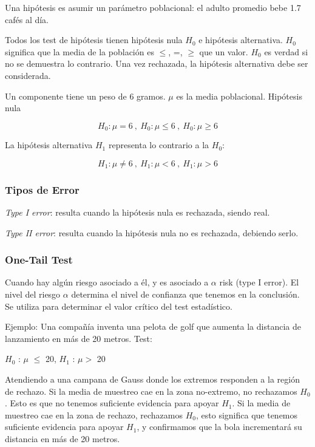 \documentclass[]{article}
\begin{document}
Una hipótesis es asumir un parámetro poblacional: el adulto promedio bebe 1.7 cafés al día.

Todos los test de hipótesis tienen hipótesis nula $H_0$ e hipótesis alternativa. $H_0$ significa que la media de la población es $\leq$, =, $\geq$ que un valor. $H_0$ es verdad si no se demuestra lo contrario. Una vez rechazada, la hipótesis alternativa debe ser considerada.

Un componente tiene un peso de 6 gramos. $\mu$ es la media poblacional. Hipótesis nula

\begin{equation}
H_0 : \mu = 6 \ , \ H_0 : \mu \leq 6 \ , \ H_0 : \mu \geq 6
\end{equation}

La hipótesis alternativa $H_1$ representa lo contrario a la $H_0$:

\begin{equation}
H_1 : \mu \neq 6 \ , \ H_1 : \mu < 6 \ , \ H_1 : \mu > 6
\end{equation}

\subsubsection{Tipos de Error}

\textit{Type I error}: resulta cuando la hipótesis nula es rechazada, siendo real. 

\textit{Type II error}: resulta cuando la hipótesis nula no es rechazada, debiendo serlo.

\subsubsection{One-Tail Test}

Cuando hay algún riesgo asociado a él, y es asociado a $\alpha$ risk (type I error). El nivel del riesgo $\alpha$ determina el nivel de confianza que tenemos en la conclusión. Se utiliza para determinar el valor crítico del test estadístico.

Ejemplo: Una compañía inventa una pelota de golf que aumenta la distancia de lanzamiento en más de 20 metros. Test:  \newline \begin{center}
	$H_0$ : $\mu$ $\leq$ 20, $H_1$ : $\mu >$ 20
\end{center}

Atendiendo a una campana de Gauss donde los extremos responden a la región de rechazo. Si la media de muestreo cae en la zona no-extremo, no rechazamos $H_0$. Esto es que no tenemos suficiente evidencia para apoyar $H_1$. Si la media de muestreo cae en la zona de rechazo, rechazamos $H_0$, esto significa que tenemos suficiente evidencia para apoyar $H_1$, y confirmamos que la bola incrementará su distancia en más de 20 metros.
\end{document}
